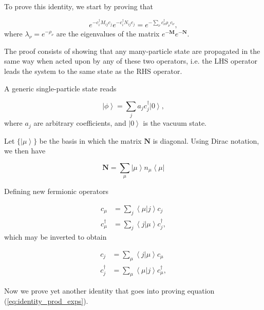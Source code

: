 To prove this identity, we start by proving that

\begin{equation}\label{eq:identity_prod_exps}
e^{-c_i^\dagger M_{ij} c_j}  e^{-c_i^\dagger N_{ij} c_j} = e^{-\sum_\nu c_\nu^\dagger \rho_\nu c_\nu} ,
\end{equation}
where $\lambda_\nu = e^{-\rho_\nu}$ are the eigenvalues of the matrix $e^{-{\bm M}} e^{-{\bm N}}$.

The proof consists of showing that any many-particle state are propagated in the same way when acted upon by any of these two operators, i.e. the LHS operator leads the system to the same state as the RHS operator.

A generic single-particle state reads

\begin{equation}
\left| \phi \right\rangle = \sum_j a_j c_j^\dagger \left| 0 \right\rangle ,
\end{equation}
where $a_j$ are arbitrary coefficients, and $\left| 0 \right\rangle$ is the vacuum state.

Let $\{\left| \mu \right\rangle \}$ be the basis in which the matrix $\bm N$ is diagonal. Using Dirac notation, we then have

\begin{equation}
\bm N = \sum_{\mu} \left| \mu \right\rangle n_\mu \left\langle \mu \right|
\end{equation}

Defining new fermionic operators

\begin{equation}\label{eq:changeBasis1}
\begin{split}
c_\mu &= \sum_j \left\langle \mu | j \right\rangle c_j \\
c_\mu^\dagger &= \sum_j \left\langle j | \mu \right\rangle c_j^\dagger ,
\end{split}
\end{equation}
which may be inverted to obtain

\begin{equation}\label{eq:changeBasis2}
\begin{split}
c_j &= \sum_\mu \left\langle j | \mu \right\rangle c_\mu \\
c_j^\dagger &= \sum_\mu \left\langle \mu | j \right\rangle c_\mu^\dagger ,
\end{split}
\end{equation}

Now we prove yet another identity that goes into proving equation (\ref{eq:identity_prod_exps}).

